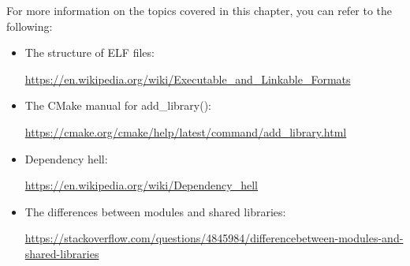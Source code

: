 
For more information on the topics covered in this chapter, you can refer to the following:

\begin{itemize}
\item 
The structure of ELF files:

\url{https://en.wikipedia.org/wiki/Executable\_and\_Linkable\_Formats}

\item 
The CMake manual for add\_library():

\url{https://cmake.org/cmake/help/latest/command/add\_library.html}

\item 
Dependency hell:

\url{https://en.wikipedia.org/wiki/Dependency\_hell}


\item 
The differences between modules and shared libraries:

\url{https://stackoverflow.com/questions/4845984/differencebetween-modules-and-shared-libraries}
\end{itemize}